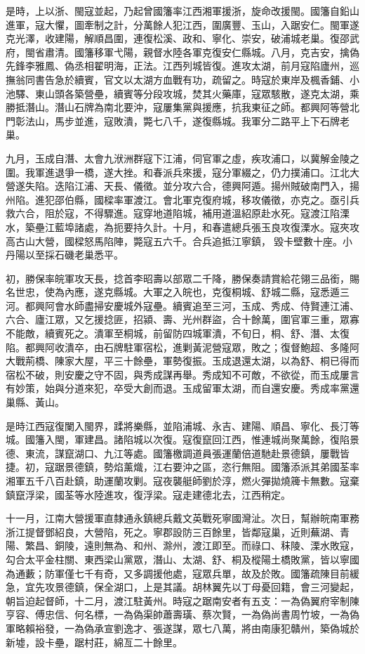 \begin{pinyinscope}
是時，上以浙、閩寇並起，乃起曾國籓率江西湘軍援浙，旋命改援閩。國籓自鉛山進軍，寇大懼，圖牽制之計，分萬餘人犯江西，圍廣豐、玉山，入踞安仁。閩軍遂克光澤，收建陽，解順昌圍，連復松溪、政和、寧化、崇安，破浦城老巢。復邵武府，閩省肅清。國籓移軍弋陽，親督水陸各軍克復安仁縣城。八月，克吉安，擒偽先鋒李雅鳳、偽丞相翟明海，正法。江西列城皆復。進攻太湖，前月寇陷廬州，巡撫翁同書告急於續賓，官文以太湖方血戰有功，疏留之。時寇於東岸及楓香鋪、小池驛、東山頭各築營壘，續賓等分段攻城，焚其火藥庫，寇眾駭散，遂克太湖，乘勝抵潛山。潛山石牌為南北要沖，寇屢集黨與援應，抗我東征之師。都興阿等營北門彰法山，馬步並進，寇敗潰，斃七八千，遂復縣城。我軍分二路平上下石牌老巢。

九月，玉成自潛、太會九洑洲群寇下江浦，伺官軍之虛，疾攻浦口，以冀解金陵之圍。我軍進退爭一橋，遂大挫。和春派兵來援，寇分軍綴之，仍力撲浦口。江北大營遂失陷。迭陷江浦、天長、儀徵。並分攻六合，德興阿遁。揚州賊破南門入，揚州陷。進犯邵伯縣，國樑率軍渡江。會北軍克復府城，移攻儀徵，亦克之。亟引兵救六合，阻於寇，不得驟進。寇穿地道陷城，補用道溫紹原赴水死。寇渡江陷溧水，築壘江藍埠諸處，為扼要持久計。十月，和春遣總兵張玉良攻復溧水。寇夾攻高古山大營，國樑怒馬陷陣，斃寇五六千。合兵追抵江寧鎮，毀卡壁數十座。小丹陽以至採石磯老巢悉平。

初，勝保率皖軍攻天長，捻首李昭壽以部眾二千降，勝保奏請賞給花翎三品銜，賜名世忠，使為內應，遂克縣城。大軍之入皖也，克復桐城、舒城二縣，寇悉遁三河。都興阿會水師盡掃安慶城外寇壘。續賓追至三河，玉成、秀成、侍賢連江浦、六合、廬江眾，又乞援捻匪，招潁、壽、光州群盜，合十餘萬，圍官軍三重，眾寡不能敵，續賓死之。潰軍至桐城，前留防四城軍潰，不旬日，桐、舒、潛、太復陷。都興阿收潰卒，由石牌駐軍宿松，進剿黃泥營寇眾，敗之；復督鮑超、多隆阿大戰荊橋、陳家大屋，平三十餘壘，軍勢復振。玉成退還太湖，以為舒、桐已得而宿松不破，則安慶之守不固，與秀成謀再舉。秀成知不可敵，不欲從，而玉成屢言有妙策，始與分道來犯，卒受大創而退。玉成留軍太湖，而自還安慶。秀成率黨還巢縣、黃山。

是時江西寇復闌入閩界，蹂將樂縣，並陷浦城、永吉、建陽、順昌、寧化、長汀等城。國籓入閩，軍建昌。諸陷城以次復。寇復竄回江西，惟連城尚聚萬餘，復陷景德、東流，謀竄湖口、九江等處。國籓檄調道員張運蘭倍道馳赴景德鎮，屢戰皆捷。初，寇踞景德鎮，勢焰薰熾，江右要沖之區，恣行無阻。國籓添派其弟國荃率湘軍五千八百赴鎮，助運蘭攻剿。寇夜襲艇師劉於淳，燃火彈拋燒簰卡無數。寇棄鎮竄浮梁，國荃等水陸進攻，復浮梁。寇走建德北去，江西稍定。

十一月，江南大營援軍直隸通永鎮總兵戴文英戰死寧國灣沚。次日，幫辦皖南軍務浙江提督鄧紹良，大營陷，死之。寧郡設防三百餘里，皆鄰寇巢，近則蕪湖、青陽、繁昌、銅陵，遠則無為、和州、滁州，渡江即至。而祿口、秣陵、溧水敗寇，勾合太平金柱關、東西梁山黨眾，潛山、太湖、舒、桐及樅陽土橋敗黨，皆以寧國為通藪；防軍僅七千有奇，又多調援他處，寇眾兵單，故及於敗。國籓疏陳目前緩急，宜先攻景德鎮，保全湖口，上是其議。胡林翼先以丁母憂回籍，會三河變起，朝旨迫起督師，十二月，渡江駐黃州。時寇之踞南安者有五支：一為偽翼府宰制陳亨容、傅忠信、何名標，一為偽渠帥蕭壽璜、蔡次賢，一為偽尚書周竹坡，一為偽軍略賴裕發，一為偽承宣劉逸才、張遂謀，眾七八萬，將由南康犯贛州，築偽城於新墟，設卡壘，踞村莊，綿亙二十餘里。


\end{pinyinscope}
